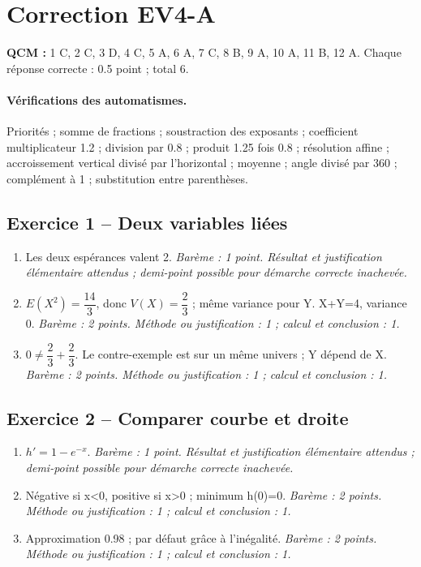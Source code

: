 \mxnewpage\section*{Correction EV4-A}\label{EV4-A-CORR}
\textbf{QCM :} 1 C, 2 C, 3 D, 4 C, 5 A, 6 A, 7 C, 8 B, 9 A, 10 A, 11 B, 12 A. Chaque réponse correcte : \num{0,5} point ; total 6.
\paragraph{Vérifications des automatismes.} Priorités ; somme de fractions ; soustraction des exposants ; coefficient multiplicateur \num{1,2} ; division par \num{0,8} ; produit \num{1,25} fois \num{0,8} ; résolution affine ; accroissement vertical divisé par l’horizontal ; moyenne ; angle divisé par 360 ; complément à 1 ; substitution entre parenthèses.
\subsection*{Exercice 1 -- Deux variables liées}
\begin{enumerate}
\item Les deux espérances valent 2. \textit{Barème : 1 point. Résultat et justification élémentaire attendus ; demi-point possible pour démarche correcte inachevée.}
\item $E(X^2)=\dfrac{14}{3}$, donc $V(X)=\dfrac{2}{3}$ ; même variance pour Y. X+Y=4, variance 0. \textit{Barème : 2 points. Méthode ou justification : 1 ; calcul et conclusion : 1.}
\item $0\ne \dfrac{2}{3}+\dfrac{2}{3}$. Le contre-exemple est sur un même univers ; Y dépend de X. \textit{Barème : 2 points. Méthode ou justification : 1 ; calcul et conclusion : 1.}
\end{enumerate}
\subsection*{Exercice 2 -- Comparer courbe et droite}
\begin{enumerate}
\item $h\prime=1-e^{-x}$. \textit{Barème : 1 point. Résultat et justification élémentaire attendus ; demi-point possible pour démarche correcte inachevée.}
\item Négative si x<0, positive si x>0 ; minimum h(0)=0. \textit{Barème : 2 points. Méthode ou justification : 1 ; calcul et conclusion : 1.}
\item Approximation \num{0,98} ; par défaut grâce à l’inégalité. \textit{Barème : 2 points. Méthode ou justification : 1 ; calcul et conclusion : 1.}
\end{enumerate}
